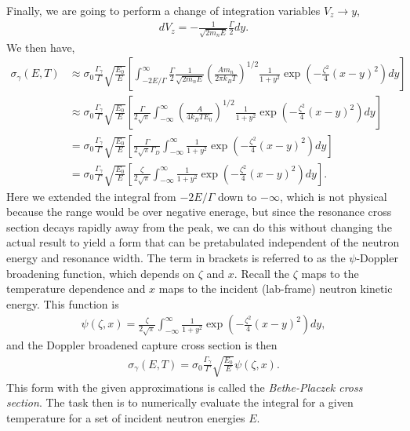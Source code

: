 Finally, we are going to perform a change of integration variables $V_z \rightarrow y$,
\begin{align}
  dV_z = -\frac{1}{\sqrt{2m_n E}} \frac{\Gamma}{2} dy .
\end{align}
We then have,
\begin{align}
  \sigma_\gamma(E,T) &\approx \sigma_0  \frac{\Gamma_\gamma}{\Gamma} \sqrt{ \frac{E_0}{E} } 
  \left[ \int_{-2E/\Gamma}^\infty \frac{\Gamma}{2} \frac{1}{\sqrt{2 m_n E}} \left( \frac{ A m_n }{ 2 \pi k_B T } \right)^{1/2} \frac{1}{1+y^2} \exp \left( -\frac{\zeta^2}{4} ( x - y )^2 \right) dy \right] \nonumber \\
  &\approx \sigma_0  \frac{\Gamma_\gamma}{\Gamma} \sqrt{ \frac{E_0}{E} } \left[  \frac{\Gamma}{2\sqrt{\pi}}
  \int_{-\infty}^\infty \left( \frac{ A  }{ 4 k_B T E_0 } \right)^{1/2} \frac{1}{1+y^2} \exp \left( -\frac{\zeta^2}{4} ( x - y )^2 \right) dy \right] \nonumber \\
  &= \sigma_0  \frac{\Gamma_\gamma}{\Gamma} \sqrt{ \frac{E_0}{E} }  \left[  \frac{\Gamma}{2\sqrt{\pi}\Gamma_D}
  \int_{-\infty}^\infty \frac{1}{1+y^2} \exp \left( -\frac{\zeta^2}{4} ( x - y )^2 \right) dy \right] \nonumber \\
  &= \sigma_0  \frac{\Gamma_\gamma}{\Gamma} \sqrt{ \frac{E_0}{E} } \left[  \frac{\zeta}{2\sqrt{\pi}}
  \int_{-\infty}^\infty \frac{1}{1+y^2} \exp \left( -\frac{\zeta^2}{4} ( x - y )^2 \right) dy \right] .
\end{align}
Here we extended the integral from $-2E/\Gamma$ down to $-\infty$, which is not physical because the range would be over negative enerage, but since the resonance cross section decays rapidly away from the peak, we can do this without changing the actual result to yield a form that can be pretabulated independent of the neutron energy and resonance width.  The term in brackets is referred to as the $\psi$-Doppler broadening function, which depends on $\zeta$ and $x$. Recall the $\zeta$ maps to the temperature dependence and $x$ maps to the incident (lab-frame) neutron kinetic energy. This function is
\begin{align}
  \psi(\zeta,x) = \frac{\zeta}{2\sqrt{\pi}} \int_{-\infty}^\infty \frac{1}{1+y^2} \exp \left( -\frac{\zeta^2}{4} ( x - y )^2 \right) dy , \label{Eq:nuclearData_DopplerBroadening_psi}
\end{align}
and the Doppler broadened capture cross section is then
\begin{align}
  \sigma_\gamma(E,T) = \sigma_0  \frac{\Gamma_\gamma}{\Gamma} \sqrt{ \frac{E_0}{E} } \psi(\zeta,x) .
\end{align}
This form with the given approximations is called the \emph{Bethe-Placzek cross section}. The task then is to numerically evaluate the integral for a given temperature for a set of incident neutron energies $E$. 

